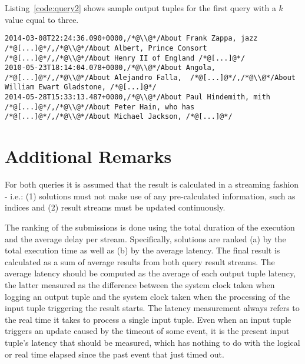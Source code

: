 \documentclass{sig-alternate}
\begin{document}
Listing~\ref{code:query2} shows sample output tuples for the first query with a $k$ value equal to three. 

\begin{lstlisting}[float=ht,caption={Output example for the community interest query},label={code:query2}]
2014-03-08T22:24:36.090+0000,/*@\\@*/About Frank Zappa, jazz /*@[...]@*/,/*@\\@*/About Albert, Prince Consort /*@[...]@*/,/*@\\@*/About Henry II of England /*@[...]@*/
2010-05-23T18:14:04.078+0000,/*@\\@*/About Angola,  /*@[...]@*/,/*@\\@*/About Alejandro Falla,  /*@[...]@*/,/*@\\@*/About William Ewart Gladstone, /*@[...]@*/
2014-05-28T15:33:13.487+0000,/*@\\@*/About Paul Hindemith, mith /*@[...]@*/,/*@\\@*/About Peter Hain, who has /*@[...]@*/,/*@\\@*/About Michael Jackson, /*@[...]@*/
\end{lstlisting}

\section{Additional Remarks}
For both queries it is assumed that the result is calculated in a streaming fashion - i.e.: (1) solutions must not make use of any pre-calculated information, such as indices and (2) result streams must be updated continuously.

The ranking of the submissions is done using the total duration of the execution and the average delay per stream. Specifically, solutions are ranked (a) by the total execution time as well as (b) by the average latency. The final result is calculated as a sum of average results from both query result streams. The average latency should be computed as the average of each output tuple latency, the latter measured as the difference between the system clock taken when logging an output tuple and the system clock taken when the processing of the input tuple triggering the result starts. The latency measurement always refers to the real time it takes to process a single input tuple. Even when an input tuple triggers an update caused by the timeout of some event, it is the present input tuple's latency that should be measured, which has nothing to do with the logical or real time elapsed since the past event that just timed out.
\end{document}
